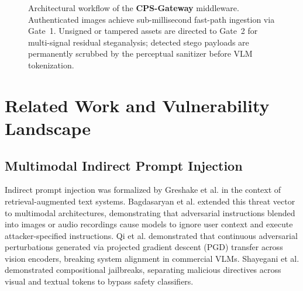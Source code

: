 \documentclass[conference]{IEEEtran}
\begin{document}
\begin{figure}[t]
\caption{Architectural workflow of the \textbf{CPS-Gateway} middleware. Authenticated images achieve sub-millisecond fast-path ingestion via Gate~1. Unsigned or tampered assets are directed to Gate~2 for multi-signal residual steganalysis; detected stego payloads are permanently scrubbed by the perceptual sanitizer before VLM tokenization.}
\label{fig:architecture_pipeline}
\end{figure}

\section{Related Work and Vulnerability Landscape}
\label{sec:related_work}

\subsection{Multimodal Indirect Prompt Injection}
Indirect prompt injection was formalized by Greshake et al. \cite{greshake2023not} in the context of retrieval-augmented text systems. Bagdasaryan et al. \cite{bagdasaryan2023abusing} extended this threat vector to multimodal architectures, demonstrating that adversarial instructions blended into images or audio recordings cause models to ignore user context and execute attacker-specified instructions. Qi et al. \cite{qi2024visual} demonstrated that continuous adversarial perturbations generated via projected gradient descent (PGD) transfer across vision encoders, breaking system alignment in commercial VLMs. Shayegani et al. \cite{shayegani2023jailbreak} demonstrated compositional jailbreaks, separating malicious directives across visual and textual tokens to bypass safety classifiers.
\end{document}
